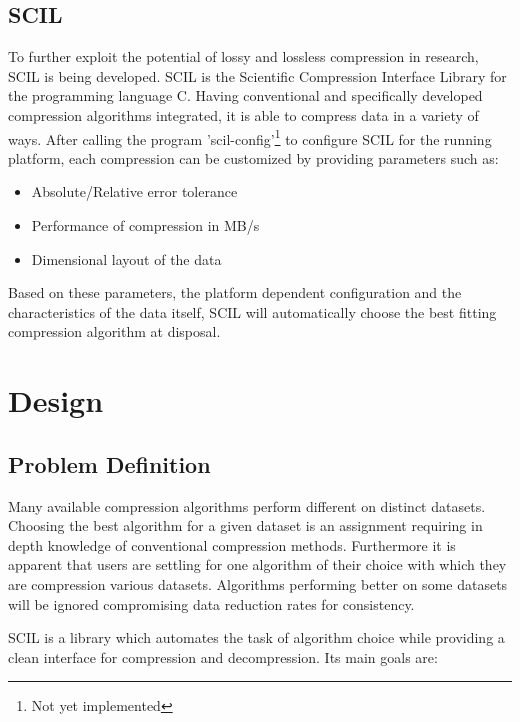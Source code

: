 \documentclass[
	12pt,
	a4paper,
	BCOR10mm,
	DIV14,
	headsepline,
]{scrreprt}
\begin{document}
\clearpage

\section{SCIL}

To further exploit the potential of lossy and lossless compression in research,
SCIL is being developed. SCIL is the Scientific Compression Interface
Library for the programming language C. Having conventional and specifically
developed compression algorithms integrated, it is able to compress data in
a variety of ways. After calling the program 'scil-config'\footnote{Not yet implemented}
to configure SCIL for the running platform, each compression can be customized
by providing parameters such as:

\bigskip

\begin{itemize}
	\item Absolute/Relative error tolerance
	\item Performance of compression in MB/s
	\item Dimensional layout of the data
\end{itemize}

\bigskip

Based on these parameters, the platform dependent configuration and the
characteristics of the data itself, SCIL will automatically choose the best
fitting compression algorithm at disposal\footnotemark[\value{footnote}].\par

\setcounter{footnote}{0}

\chapter{Design}
\label{Design}

\section{Problem Definition}

\bigskip

Many available compression algorithms perform different on distinct datasets.
Choosing the best algorithm for a given dataset is an assignment requiring
in depth knowledge of conventional compression methods. Furthermore it is
apparent that users are settling for one algorithm of their choice with which
they are compression various datasets. Algorithms performing better on some
datasets will be ignored compromising data reduction rates for consistency.\par
SCIL is a library which automates the task of algorithm choice while providing
a clean interface for compression and decompression. Its main goals are:
\end{document}
